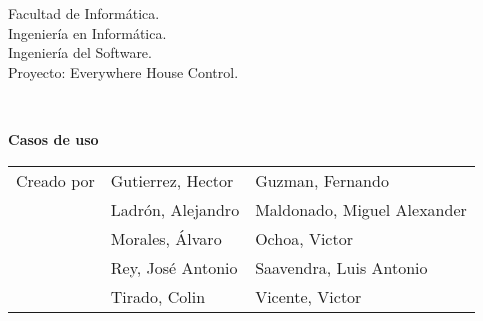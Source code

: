 \begin{titlepage}
    \begin{scriptsize}\noindent Facultad de Informática.\\
        Ingeniería en Informática.\\
        Ingeniería del Software.\\
        Proyecto: Everywhere House Control.
    \end{scriptsize}\\
    \vfill
    \begin{center}
        \begin{Large}
            \textbf{Casos de uso}
        \end{Large}
    \end{center}
    \vfill
    \begin{flushright}
        \begin{scriptsize}
            \begin{tabular}{lll}
            Creado por & Gutierrez, Hector & Guzman, Fernando  \\
                 & Ladrón, Alejandro & Maldonado, Miguel Alexander \\
                 & Morales, Álvaro & Ochoa, Victor \\
                 & Rey, José Antonio & Saavendra, Luis Antonio  \\
                 & Tirado, Colin & Vicente, Victor \\
            \end{tabular}
        \end{scriptsize}
    \end{flushright}
\end{titlepage}
\thispagestyle{empty}
\cleardoublepage
\newpage

\tableofcontents
\newpage
\thispagestyle{empty}
\cleardoublepage
\newpage
{}
\raggedbottom
{}
























